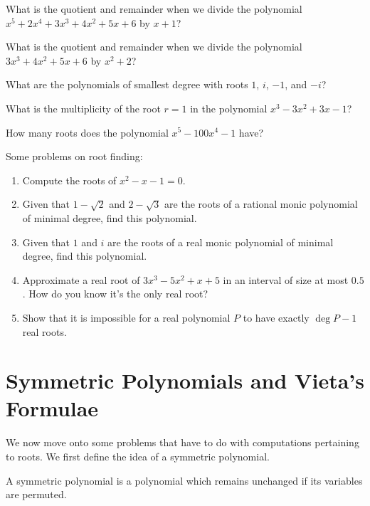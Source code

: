 \documentclass[11pt]{scrartcl}
\begin{document}
\begin{problem}[1]{}
What is the quotient and remainder when we divide the polynomial $x^5+2x^4+3x^3+4x^2+5x+6$ by $x+1$?
\end{problem}
\begin{problem}[2]{}
What is the quotient and remainder when we divide the polynomial $3x^3+4x^2+5x+6$ by $x^2+2$?
\end{problem}
\begin{problem}[3]{}
What are the polynomials of smallest degree with roots $1$, $i$, $-1$, and $-i$?
\end{problem}
\begin{problem}[4]{}
What is the multiplicity of the root $r = 1$ in the polynomial $x^3-3x^2+3x-1$?
\end{problem}
\begin{problem}[5]{}
How many roots does the polynomial $x^5-100x^4-1$ have?
\end{problem}
\begin{problem}[6]{}
Some problems on root finding:
\begin{enumerate}
\item Compute the roots of $x^2-x-1 = 0$.
\item Given that $1-\sqrt{2}$ and $2-\sqrt{3}$ are the roots of a rational monic polynomial of minimal degree, find this polynomial.
\item Given that $1$ and $i$ are the roots of a real monic polynomial of minimal degree, find this polynomial.
\item Approximate a real root of $3x^3-5x^2+x+5$ in an interval of size at most $0.5$. How do you know it's the only real root?
\item Show that it is impossible for a real polynomial $P$ to have exactly $\deg P - 1$ real roots.
\end{enumerate}
\end{problem}

\newpage

\section{Symmetric Polynomials and Vieta's Formulae}

We now move onto some problems that have to do with computations pertaining to roots. We first define the idea of a symmetric polynomial.

\begin{definition*}
A symmetric polynomial is a polynomial which remains unchanged if its variables are permuted.
\end{definition*}
\end{document}
